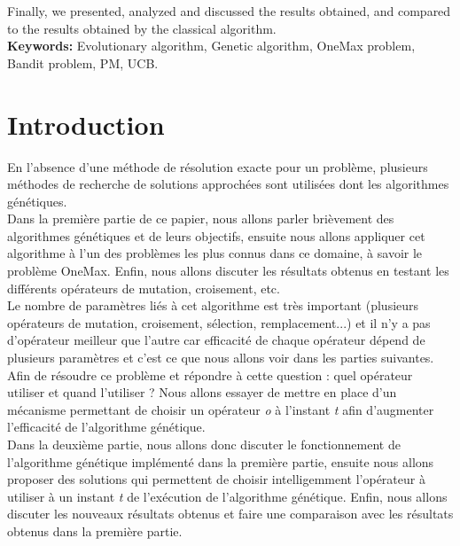\documentclass[12pt]{article}
\begin{document}
Finally, we presented, analyzed and discussed the results obtained, and compared to the results obtained by the classical algorithm.\\

\textbf{Keywords:} Evolutionary algorithm, Genetic algorithm, OneMax problem, Bandit problem, PM, UCB.

\newpage
\renewcommand\headrulewidth{1 pt}\fancyhead[L]{}\fancyhead[C]{} 

\section{Introduction}
En l'absence d'une méthode de résolution exacte pour un problème, plusieurs méthodes de recherche de solutions approchées sont utilisées dont les algorithmes génétiques.\\
 
Dans la première partie de ce papier, nous allons parler brièvement des algorithmes génétiques et de leurs objectifs, ensuite nous allons appliquer cet algorithme à l'un des problèmes les plus connus dans ce domaine, à savoir le problème OneMax. Enfin, nous allons discuter les résultats obtenus en testant les différents opérateurs de mutation, croisement, etc.\\

Le nombre de paramètres liés à cet algorithme est très important (plusieurs opérateurs de mutation, croisement, sélection, remplacement...) et il n'y a pas d'opérateur meilleur que l'autre car efficacité de chaque opérateur dépend de plusieurs paramètres et c'est ce que nous allons voir dans les parties suivantes. Afin de résoudre ce problème et répondre à cette question : quel opérateur utiliser et quand l'utiliser ? Nous allons essayer de mettre en place d'un mécanisme permettant de choisir un opérateur \textit{o} à l'instant \textit{t} afin d'augmenter l'efficacité de l'algorithme génétique.\\

Dans la deuxième partie, nous allons donc discuter le fonctionnement de l'algorithme génétique implémenté dans la première partie, ensuite nous allons proposer des solutions qui permettent de choisir intelligemment l'opérateur à utiliser à un instant \textit{t} de l'exécution de l'algorithme génétique. Enfin, nous allons discuter les nouveaux résultats obtenus et faire une comparaison avec les résultats obtenus dans la première partie.
\end{document}
